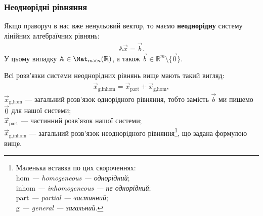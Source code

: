 \documentclass{math_library}
\begin{document}
\subsubsection{Неоднорідні рівняння}
Якщо праворуч в нас вже ненульовий вектор, то маємо \textbf{неоднорідну} систему лінійних алгебраїчних рівнянь:
\begin{align*}
\mathbb{A} \vec{x} = \vec{b}.
\end{align*}
У цьому випадку $\mathbb{A} \in \Mat_{m \times n}(\mathbb{R})$, а також $\vec{b} \in \mathbb{R}^m \setminus \{\vec{0}\}$.

\begin{theorem}
Всі розв'язки системи неоднорідних рівнянь вище мають такий вигляд:
\begin{align*}
\vec{x}_{\text{g,inhom}} = \vec{x}_{\text{part}} + \vec{x}_{\text{g,hom}},
\end{align*}
$\vec{x}_{\text{g,hom}}$ --- загальний розв'язок однорідного рівняння, тобто замість $\vec{b}$ ми пишемо $\vec{0}$ для нашої системи;\\
$\vec{x}_{\text{part}}$ --- частинний розв'язок нашої системи;\\
$\vec{x}_{\text{g,inhom}}$ --- загальний розв'язок неоднорідного рівняння\footnote{Маленька вставка по цих скороченнях:\\
hom \textit{--- homogeneous --- однорідний};\\
inhom \textit{--- inhomogeneous --- не однорідний};\\
part \textit{--- partial --- частинний};\\
g \textit{--- general --- загальний}.}, що задана формулою вище.
\end{theorem}
\end{document}
